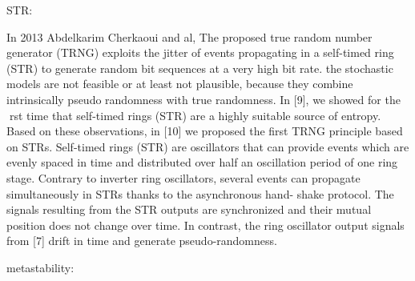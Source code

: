 STR:

In 2013 Abdelkarim Cherkaoui and al, The proposed true random number generator (TRNG) exploits the jitter of events propagating in a self-timed ring (STR) to generate random bit sequences at a very high bit rate. the stochastic models are not feasible or at least not plausible, because they combine intrinsically pseudo randomness with true randomness. In [9], we showed for the rst time that self-timed rings (STR) are a highly suitable source of entropy. Based on these observations, in [10] we proposed the first TRNG principle based on STRs. Self-timed rings (STR) are oscillators that can provide events which are evenly spaced in time and distributed over half an oscillation period of one ring stage. Contrary to inverter ring oscillators, several events can propagate simultaneously in STRs thanks to the asynchronous hand- shake protocol. The signals resulting from the STR outputs are synchronized and their mutual position does not change over time. In contrast, the ring oscillator output signals from [7] drift in time and generate pseudo-randomness.

metastability: